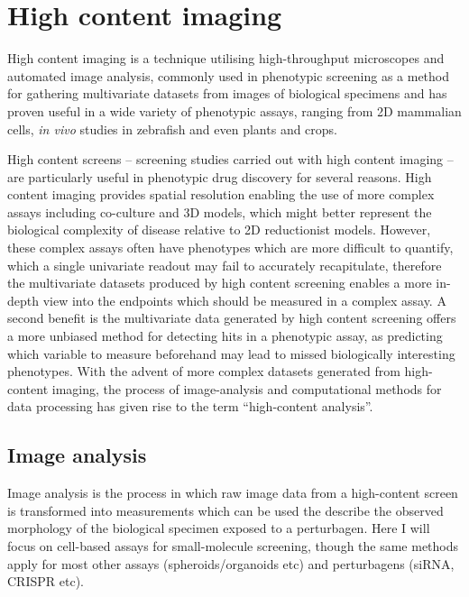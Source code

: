 \documentclass[a4paper,11pt,twoside,openright]{scrbook}
\begin{document}



\section{High content imaging}
High content imaging is a technique utilising high-throughput microscopes and automated image analysis, commonly used in phenotypic screening as a method for gathering multivariate datasets from images of biological specimens and has proven useful in a wide variety of phenotypic assays, ranging from 2D mammalian cells, \cite{Leggett2016,Tabata2015} \textit{in vivo} studies in zebrafish \cite{GeoffreyBurns2005} and even plants and crops. \cite{Chen2014}

High content screens -- screening studies carried out with high content imaging -- are particularly useful in phenotypic drug discovery for several reasons.
High content imaging provides spatial resolution enabling the use of more complex assays including co-culture and 3D models, which might better represent the biological complexity of disease relative to 2D reductionist models.
However, these complex assays often have phenotypes which are more difficult to quantify, which a single univariate readout may fail to accurately recapitulate,
therefore the multivariate datasets produced by high content screening enables a more in-depth view into the endpoints which should be measured in a complex assay.
A second benefit is the multivariate data generated by high content screening offers a more unbiased method for detecting hits in a phenotypic assay, as predicting which variable to measure beforehand may lead to missed biologically interesting phenotypes.
With the advent of more complex datasets generated from high-content imaging, the process of image-analysis and computational methods for data processing has given rise to the term ``high-content analysis''.


\subsection{Image analysis}
Image analysis is the process in which raw image data from a high-content screen is transformed into measurements which can be used the describe the observed morphology of the biological specimen exposed to a perturbagen.
Here I will focus on cell-based assays for small-molecule screening, though the same methods apply for most other assays (spheroids/organoids etc) and perturbagens (siRNA, CRISPR etc).
\end{document}
